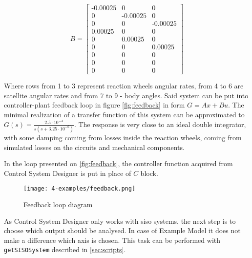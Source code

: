         \small
        \begin{equation}
            B = 
            \begin{bmatrix}
                \text{-}0.00025  &           0 &            0 \\
                       0  &     \text{-}0.00025 &            0 \\
                       0  &           0 &      \text{-}0.00025 \\
                 0.00025  &           0 &            0 \\
                       0  &     0.00025 &            0 \\
                       0  &           0 &      0.00025 \\
                       0  &           0 &            0 \\
                       0  &           0 &            0 \\
                       0  &           0 &            0
            \end{bmatrix}
        \end{equation}
        \normalsize
    
        Where rows from 1 to 3 represent reaction wheels angular rates, from 4 to 6 are satellite angular rates and from 7 to 9 - body angles. Said system can be put into controller-plant feedback loop in figure \autoref{fig:feedback} in form $G = Ax + Bu$. The minimal realization of a transfer function of this system can be approximated to $G(s) = \frac{2.5\cdot10^{-4}}{s(s+3.25\cdot10^{-6})}$. The response is very close to an ideal double integrator, with some damping coming from losses inside the reaction wheels, coming from simulated losses on the circuits and mechanical components. 
        
        In the loop presented on \autoref{fig:feedback}, the controller function acquired from Control System Designer is put in place of $C$ block.

        \begin{figure}[H]
            \centering
            \texttt{[image: 4-examples/feedback.png]}
            \caption{Feedback loop diagram}
            \label{fig:feedback}
        \end{figure}

        As Control System Designer only works with \ac{siso} systems, the next step is to choose which output should be analysed. In case of Example Model it does not make a difference which axis is chosen. This task can be performed with \verb|getSISOSystem| described in \autoref{sec:scripts}.
        
